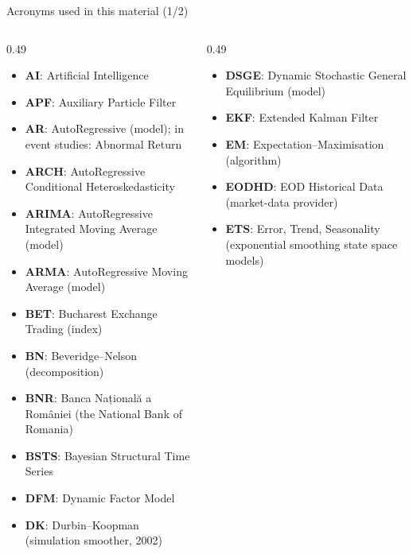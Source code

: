 {
\begin{frame}[noframenumbering]
    \titlepage
\end{frame}
}
\begin{frame}{Acronyms used in this material (1/2)}
\begin{columns}[T]
\begin{column}{0.49\textwidth}
\begin{itemize}\setlength{\itemsep}{0pt}
    \item \textbf{AI}: Artificial Intelligence
    \item \textbf{APF}: Auxiliary Particle Filter
    \item \textbf{AR}: AutoRegressive (model); in event studies: Abnormal Return
    \item \textbf{ARCH}: AutoRegressive Conditional Heteroskedasticity
    \item \textbf{ARIMA}: AutoRegressive Integrated Moving Average (model)
    \item \textbf{ARMA}: AutoRegressive Moving Average (model)
    \item \textbf{BET}: Bucharest Exchange Trading (index)
    \item \textbf{BN}: Beveridge–Nelson (decomposition)
    \item \textbf{BNR}: Banca Națională a României (the National Bank of Romania)
    \item \textbf{BSTS}: Bayesian Structural Time Series
    \item \textbf{DFM}: Dynamic Factor Model
    \item \textbf{DK}: Durbin–Koopman (simulation smoother, 2002)
\end{itemize}
\end{column}
\begin{column}{0.49\textwidth}
\begin{itemize}\setlength{\itemsep}{0pt}
    \item \textbf{DSGE}: Dynamic Stochastic General Equilibrium (model)
    \item \textbf{EKF}: Extended Kalman Filter
    \item \textbf{EM}: Expectation–Maximisation (algorithm)
    \item \textbf{EODHD}: EOD Historical Data (market-data provider)
    \item \textbf{ETS}: Error, Trend, Seasonality (exponential smoothing state space models)

\end{itemize}
\end{column}
\end{columns}
\end{frame}
